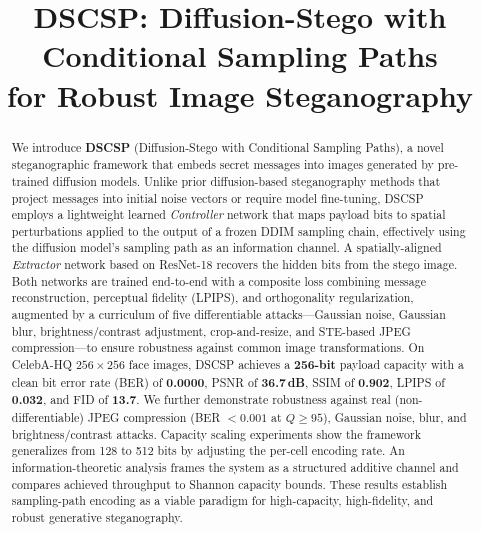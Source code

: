 \documentclass[10pt, twocolumn]{article}
\title{\textbf{DSCSP: Diffusion-Stego with Conditional Sampling Paths\\for Robust Image Steganography}}
\author{
}
\date{}
\begin{document}
\maketitle

\begin{abstract}
We introduce \textbf{DSCSP} (Diffusion-Stego with Conditional Sampling Paths), a novel steganographic framework that embeds secret messages into images generated by pre-trained diffusion models.
Unlike prior diffusion-based steganography methods that project messages into initial noise vectors or require model fine-tuning, DSCSP employs a lightweight learned \emph{Controller} network that maps payload bits to spatial perturbations applied to the output of a frozen DDIM sampling chain, effectively using the diffusion model's sampling path as an information channel.
A spatially-aligned \emph{Extractor} network based on ResNet-18 recovers the hidden bits from the stego image.
Both networks are trained end-to-end with a composite loss combining message reconstruction, perceptual fidelity (LPIPS), and orthogonality regularization, augmented by a curriculum of five differentiable attacks---Gaussian noise, Gaussian blur, brightness/contrast adjustment, crop-and-resize, and STE-based JPEG compression---to ensure robustness against common image transformations.
On CelebA-HQ $256\times256$ face images, DSCSP achieves a \textbf{256-bit} payload capacity with a clean bit error rate (BER) of \textbf{0.0000}, PSNR of \textbf{36.7\,dB}, SSIM of \textbf{0.902}, LPIPS of \textbf{0.032}, and FID of \textbf{13.7}.
We further demonstrate robustness against real (non-differentiable) JPEG compression (BER $< 0.001$ at $Q \geq 95$), Gaussian noise, blur, and brightness/contrast attacks.
Capacity scaling experiments show the framework generalizes from 128 to 512 bits by adjusting the per-cell encoding rate.
An information-theoretic analysis frames the system as a structured additive channel and compares achieved throughput to Shannon capacity bounds.
These results establish sampling-path encoding as a viable paradigm for high-capacity, high-fidelity, and robust generative steganography.
\end{abstract}

\end{document}
